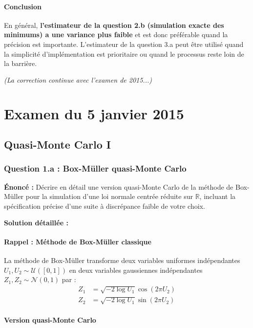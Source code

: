\documentclass[12pt,a4paper]{article}
\theoremstyle{definition}
\theoremstyle{remark}
\newcommand{\R}{\mathbb{R}}
\begin{document}
\paragraph{Conclusion}

En général, \textbf{l'estimateur de la question 2.b (simulation exacte des minimums) a une variance plus faible} et est donc préférable quand la précision est importante. L'estimateur de la question 3.a peut être utilisé quand la simplicité d'implémentation est prioritaire ou quand le processus reste loin de la barrière.

\textit{(La correction continue avec l'examen de 2015...)}

\newpage
\section{Examen du 5 janvier 2015}

\subsection{Quasi-Monte Carlo I}

\subsubsection{Question 1.a : Box-Müller quasi-Monte Carlo}

\textbf{Énoncé :} Décrire en détail une version quasi-Monte Carlo de la méthode de Box-Müller pour la simulation d'une loi normale centrée réduite sur $\R$, incluant la spécification précise d'une suite à discrépance faible de votre choix.

\textbf{Solution détaillée :}

\paragraph{Rappel : Méthode de Box-Müller classique}

La méthode de Box-Müller transforme deux variables uniformes indépendantes $U_1, U_2 \sim \mathcal{U}([0,1])$ en deux variables gaussiennes indépendantes $Z_1, Z_2 \sim \mathcal{N}(0,1)$ par :
\begin{align*}
Z_1 &= \sqrt{-2\log U_1} \cos(2\pi U_2) \\
Z_2 &= \sqrt{-2\log U_1} \sin(2\pi U_2)
\end{align*}

\paragraph{Version quasi-Monte Carlo}
\end{document}
